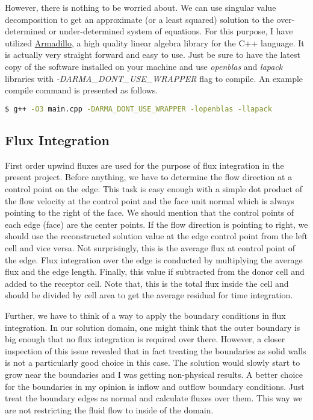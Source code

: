 \documentclass{article}
\begin{document}
However, there is nothing to be worried about. We can use singular value decomposition to get an approximate (or a least squared) solution to the over-determined or under-determined system of equations. For this purpose, I have utilized \href{http://arma.sourceforge.net}{Armadillo}, a high quality linear algebra library for the C++ language. It is actually very straight forward and easy to use. Just be sure to have the latest copy of the software installed on your machine and use \textit{openblas} and \textit{lapack} libraries with \textit{-DARMA\_DONT\_USE\_WRAPPER} flag to compile. An example compile command is presented as follows.
\begin{lstlisting}[language=bash]
$ g++ -O3 main.cpp -DARMA_DONT_USE_WRAPPER -lopenblas -llapack
\end{lstlisting}

\subsection{Flux Integration}
First order upwind fluxes are used for the purpose of flux integration in the present project. Before anything, we have to determine the flow direction at a control point on the edge. This task is easy enough with a simple dot product of the flow velocity at the control point and the face unit normal which is always pointing to the right of the face. We should mention that the control points of each edge (face) are the center points. If the flow direction is pointing to right, we should use the reconstructed solution value at the edge control point from the left cell and vice versa. Not surprisingly, this is the average flux at control point of the edge. Flux integration over the edge is conducted by multiplying the average flux and the edge length. Finally, this value if subtracted from the donor cell and added to the receptor cell. Note that, this is the total flux inside the cell and should be divided by cell area to get the average residual for time integration.

Further, we have to think of a way to apply the boundary conditions in flux integration. In our solution domain, one might think that the outer boundary is big enough that no flux integration is required over there. However, a closer inspection of this issue revealed that in fact treating the boundaries as solid walls is not a particularly good choice in this case. The solution would slowly start to grow near the boundaries and I was getting non-physical results. A better choice for the boundaries in my opinion is inflow and outflow boundary conditions. Just treat the boundary edges as normal and calculate fluxes over them. This way we are not restricting the fluid flow to inside of the domain.
\end{document}

